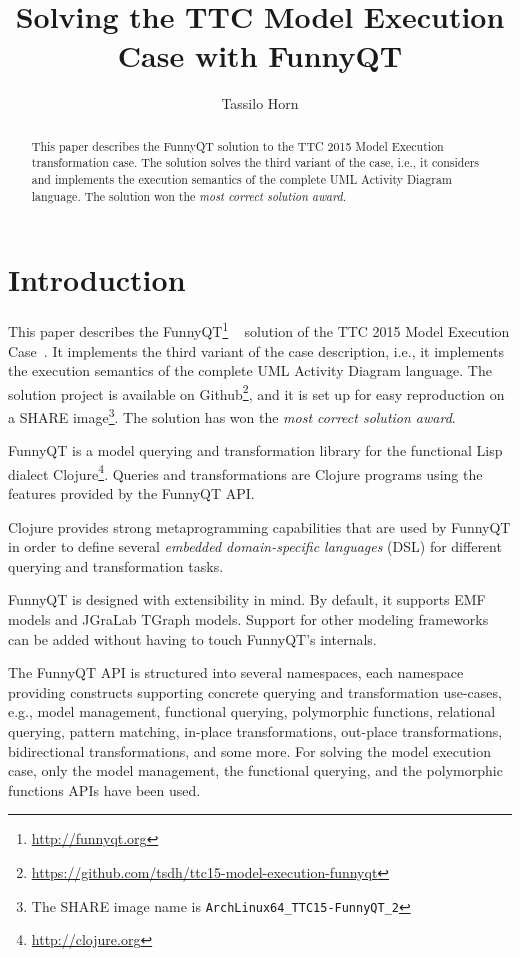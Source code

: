 \documentclass[submission]{eptcs}
\title{Solving the TTC Model Execution Case with FunnyQT}
\author{Tassilo Horn
  \institute{Institute for Software Technology, University Koblenz-Landau, Germany}
  \email{horn@uni-koblenz.de}}
\begin{document}
\maketitle

\begin{abstract}
  This paper describes the FunnyQT solution to the TTC 2015 Model Execution
  transformation case.  The solution solves the third variant of the case,
  i.e., it considers and implements the execution semantics of the complete UML
  Activity Diagram language.  The solution won the \emph{most correct solution
    award}.
\end{abstract}


\section{Introduction}
\label{sec:introduction}

This paper describes the FunnyQT\footnote{\url{http://funnyqt.org}}
~\cite{Horn2013MQWFQ,funnyqt-icgt15} solution of the TTC 2015 Model Execution
Case~\cite{model-execution-case-desc}.  It implements the third variant of the
case description, i.e., it implements the execution semantics of the complete
UML Activity Diagram language.  The solution project is available on
Github\footnote{\url{https://github.com/tsdh/ttc15-model-execution-funnyqt}},
and it is set up for easy reproduction on a SHARE image\footnote{The SHARE
  image name is \verb|ArchLinux64_TTC15-FunnyQT_2|}.  The solution has won the
\emph{most correct solution award}.

FunnyQT is a model querying and transformation library for the functional Lisp
dialect Clojure\footnote{\url{http://clojure.org}}.  Queries and
transformations are Clojure programs using the features provided by the FunnyQT
API.

Clojure provides strong metaprogramming capabilities that are used by FunnyQT
in order to define several \emph{embedded domain-specific languages} (DSL) for
different querying and transformation tasks.

FunnyQT is designed with extensibility in mind.  By default, it supports EMF
models and JGraLab TGraph models.  Support for other modeling frameworks can be
added without having to touch FunnyQT's internals.

The FunnyQT API is structured into several namespaces, each namespace providing
constructs supporting concrete querying and transformation use-cases, e.g.,
model management, functional querying, polymorphic functions, relational
querying, pattern matching, in-place transformations, out-place
transformations, bidirectional transformations, and some more.  For solving the
model execution case, only the model management, the functional querying, and
the polymorphic functions APIs have been used.
\end{document}
